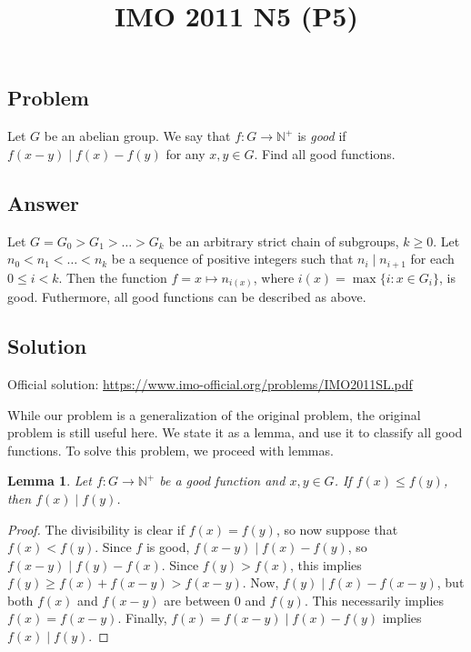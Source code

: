 \documentclass{article}
\title{IMO 2011 N5 (P5)}
\author{}
\date{}
\newcommand{\N}{\mathbb{N}}
\newtheorem{lemma}{Lemma}
\begin{document}
\maketitle



\subsection*{Problem}

Let $G$ be an abelian group.
We say that $f : G \to \N^+$ is \emph{good} if $f(x - y) \mid f(x) - f(y)$ for any $x, y \in G$.
Find all good functions.



\subsection*{Answer}

Let $G = G_0 > G_1 > \ldots > G_k$ be an arbitrary strict chain of subgroups, $k \geq 0$.
Let $n_0 < n_1 < \ldots < n_k$ be a sequence of positive integers such that $n_i \mid n_{i + 1}$ for each $0 \leq i < k$.
Then the function $f = x \mapsto n_{i(x)}$, where $i(x) = \max\{i : x \in G_i\}$, is good.
Futhermore, all good functions can be described as above.



\subsection*{Solution}

Official solution: \url{https://www.imo-official.org/problems/IMO2011SL.pdf}

While our problem is a generalization of the original problem, the original problem is still useful here.
We state it as a lemma, and use it to classify all good functions.
To solve this problem, we proceed with lemmas.

\begin{lemma}\label{2011n5-1}
Let $f : G \to \N^+$ be a good function and $x, y \in G$.
If $f(x) \leq f(y)$, then $f(x) \mid f(y)$.
\end{lemma}
\begin{proof}
The divisibility is clear if $f(x) = f(y)$, so now suppose that $f(x) < f(y)$.
Since $f$ is good, $f(x - y) \mid f(x) - f(y)$, so $f(x - y) \mid f(y) - f(x)$.
Since $f(y) > f(x)$, this implies $f(y) \geq f(x) + f(x - y) > f(x - y)$.
Now, $f(y) \mid f(x) - f(x - y)$, but both $f(x)$ and $f(x - y)$ are between $0$ and $f(y)$.
This necessarily implies $f(x) = f(x - y)$.
Finally, $f(x) = f(x - y) \mid f(x) - f(y)$ implies $f(x) \mid f(y)$.
\end{proof}
\end{document}
